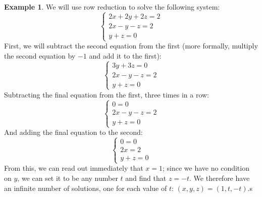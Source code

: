 \documentclass[a4paper,leqno]{article}
\numberwithin{equation}{section}
\theoremstyle{definition}
\newtheorem{ex}[equation]{Example}
\theoremstyle{remark}
\begin{document}
\begin{ex}
  We will use row reduction to solve the following system:
  \begin{equation}
    \begin{cases}
      2x + 2y + 2z = 2\\
      2x - y - z = 2\\
      y + z = 0
    \end{cases}
  \end{equation}
  First, we will subtract the second equation from the first (more formally, multiply the second equation by $ -1 $ and add it to the first):
  \begin{equation*}
    \begin{cases}
      3y + 3z = 0\\
      2x - y - z = 2\\
      y + z = 0
    \end{cases}
  \end{equation*}
  Subtracting the final equation from the first, three times in a row:
  \begin{equation*}
    \begin{cases}
      0 = 0\\
      2x - y - z = 2\\
      y + z = 0
    \end{cases}
  \end{equation*}
  And adding the final equation to the second:
  \begin{equation}
    \begin{cases}
      0 = 0\\
      2x = 2\\
      y + z = 0
    \end{cases}
  \end{equation}
  From this, we can read out immediately that $ x = 1 $; since we have no condition on $ y $, we can set it to be any number $ t $ and
  find that $ z = -t $. We therefore have an infinite number of solutions, one for each value of $ t $: $ (x,y,z) = (1,t,-t) $.s
\end{ex}
\end{document}
